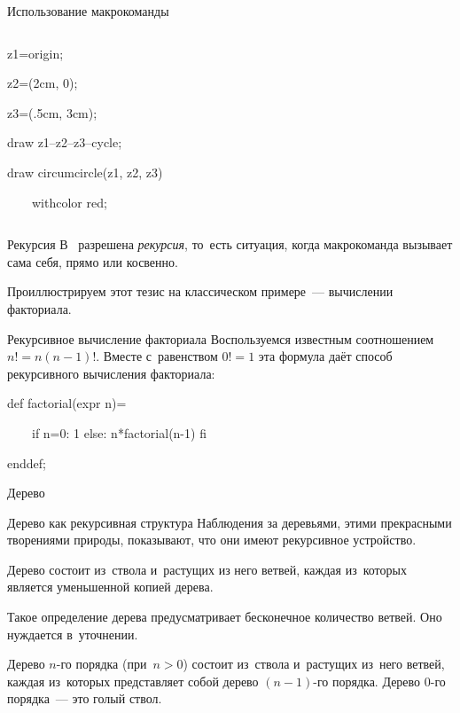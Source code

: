 \begin{frame}{Использование макрокоманды }
\begin{columns}

\begin{programlisting}
z1=origin;\par
z2=(2cm, 0);\par
z3=(.5cm, 3cm);\par
draw z1--z2--z3--cycle;\par
draw circumcircle(z1, z2, z3)\par
~~~~withcolor red;
\end{programlisting}
\end{columns}
\end{frame}

\begin{frame}{Рекурсия}
В~ разрешена \emph{рекурсия}, то~есть ситуация, когда
макрокоманда вызывает сама себя, прямо или косвенно.

Проиллюстрируем этот тезис на классическом примере~— вычислении факториала.
\end{frame}

\begin{frame}{Рекурсивное вычисление факториала}
Воспользуемся известным соотношением $n!=n(n-1)!$. Вместе с~равенством $0!=1$
эта формула даёт способ рекурсивного вычисления факториала:

\begin{programlisting}
def factorial(expr n)=\par
~~~~if n=0: 1 else: n*factorial(n-1) fi\par
enddef;
\end{programlisting}
\end{frame}

\begin{frame}{Дерево}
\centerline{}
\end{frame}

\begin{frame}{Дерево как рекурсивная структура}
Наблюдения за деревьями, этими прекрасными творениями природы, показывают, что
они имеют рекурсивное устройство.

Дерево состоит из~ствола и~растущих из него ветвей, каждая из~которых является
уменьшенной копией дерева.

Такое определение дерева предусматривает бесконечное количество ветвей. Оно
нуждается в~уточнении.

Дерево $n$-го порядка (при $n>0$) состоит из~ствола и~растущих из~него ветвей,
каждая из~которых представляет собой дерево $(n-1)$-го порядка. Дерево $0$-го
порядка~— это голый ствол.
\end{frame}

